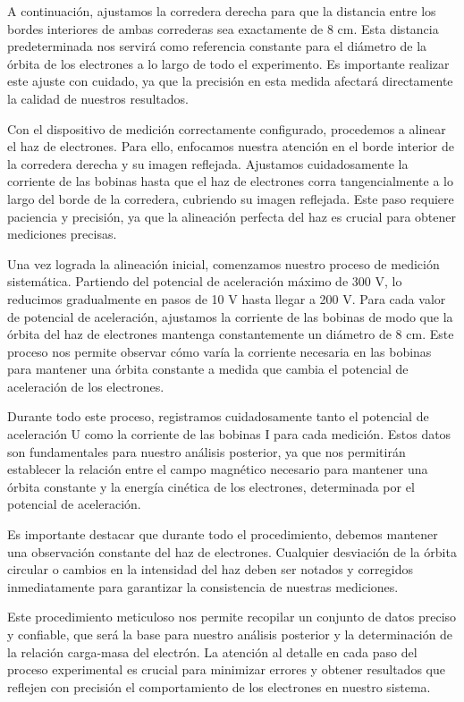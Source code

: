 \documentclass[twocolumn,a4paper,11pt]{scrartcl}
\begin{document}
A continuación, ajustamos la corredera derecha para que la distancia entre los bordes interiores de ambas correderas sea exactamente de 8 cm. Esta distancia predeterminada nos servirá como referencia constante para el diámetro de la órbita de los electrones a lo largo de todo el experimento. Es importante realizar este ajuste con cuidado, ya que la precisión en esta medida afectará directamente la calidad de nuestros resultados.

Con el dispositivo de medición correctamente configurado, procedemos a alinear el haz de electrones. Para ello, enfocamos nuestra atención en el borde interior de la corredera derecha y su imagen reflejada. Ajustamos cuidadosamente la corriente de las bobinas hasta que el haz de electrones corra tangencialmente a lo largo del borde de la corredera, cubriendo su imagen reflejada. Este paso requiere paciencia y precisión, ya que la alineación perfecta del haz es crucial para obtener mediciones precisas.

Una vez lograda la alineación inicial, comenzamos nuestro proceso de medición sistemática. Partiendo del potencial de aceleración máximo de 300 V, lo reducimos gradualmente en pasos de 10 V hasta llegar a 200 V. Para cada valor de potencial de aceleración, ajustamos la corriente de las bobinas de modo que la órbita del haz de electrones mantenga constantemente un diámetro de 8 cm. Este proceso nos permite observar cómo varía la corriente necesaria en las bobinas para mantener una órbita constante a medida que cambia el potencial de aceleración de los electrones.

Durante todo este proceso, registramos cuidadosamente tanto el potencial de aceleración U como la corriente de las bobinas I para cada medición. Estos datos son fundamentales para nuestro análisis posterior, ya que nos permitirán establecer la relación entre el campo magnético necesario para mantener una órbita constante y la energía cinética de los electrones, determinada por el potencial de aceleración.

Es importante destacar que durante todo el procedimiento, debemos mantener una observación constante del haz de electrones. Cualquier desviación de la órbita circular o cambios en la intensidad del haz deben ser notados y corregidos inmediatamente para garantizar la consistencia de nuestras mediciones.

Este procedimiento meticuloso nos permite recopilar un conjunto de datos preciso y confiable, que será la base para nuestro análisis posterior y la determinación de la relación carga-masa del electrón. La atención al detalle en cada paso del proceso experimental es crucial para minimizar errores y obtener resultados que reflejen con precisión el comportamiento de los electrones en nuestro sistema.
\end{document}

